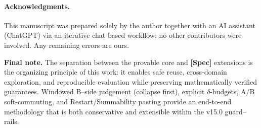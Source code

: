 \documentclass[11pt]{article}
\DeclareRobustCommand{\hyp}{\nobreakdash-}
\numberwithin{equation}{section}
\theoremstyle{definition}
\begin{document}
\paragraph{Acknowledgments.}
This manuscript was prepared solely by the author together with an AI assistant (ChatGPT) via an iterative chat\hyp based workflow; no other contributors were involved. Any remaining errors are ours.

\medskip
\noindent\textbf{Final note.}
The separation between the provable core and \textbf{[Spec]} extensions is the organizing principle of this work:
it enables safe reuse, cross\hyp domain exploration, and reproducible evaluation while preserving mathematically verified guarantees.
Windowed B–side judgement (collapse first), explicit \(\delta\)\hyp budgets, A/B soft\hyp commuting, and Restart/Summability pasting provide an end\hyp to\hyp end methodology that is both conservative and extensible within the v15.0 guard–rails.
\end{document}
